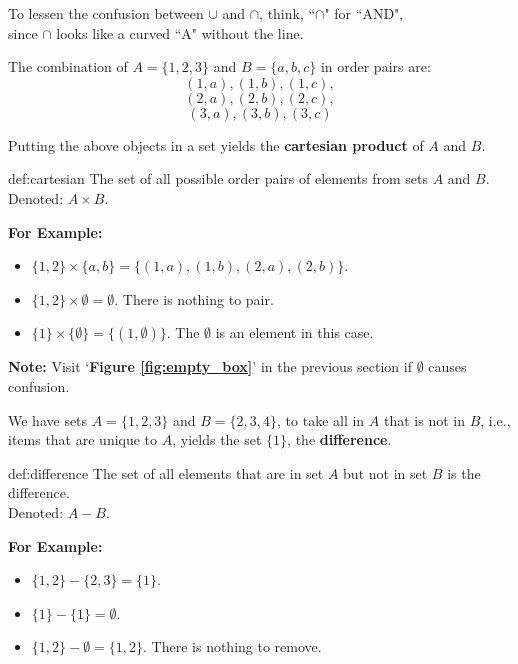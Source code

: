 \begin{Tip}
    To lessen the confusion between $\cup$ and $\cap$, think, ``$\cap$" for ``AND",\\
    since $\cap$ looks like a curved ``A" without the line. \\
\end{Tip}

\noindent
The combination of $A=\{1,2,3\}$ and $B=\{a,b,c\}$ in order pairs are:
$$(1,a), (1,b), (1,c), $$
$$(2,a), (2,b), (2,c), $$
$$(3,a), (3,b), (3,c)$$

\noindent
Putting the above objects in a set yields the \textbf{cartesian product} of $A$ and $B$.

\begin{Def}{def:cartesian}
    The set of all possible order pairs of elements from sets $A$ and $B$.\\
    Denoted: $A \times B$.
\end{Def}

\noindent
\textbf{For Example:}
\begin{itemize}
    \item $\{1, 2\} \times \{a, b\} = \{(1,a), (1,b), (2,a), (2,b)\}$.
    \item $\{1,2\} \times \emptyset = \emptyset$. There is nothing to pair.
    \item $\{1\} \times \{\emptyset\} = \{(1,\emptyset)\}$. The $\emptyset$ is an element in this case.
\end{itemize}

\begin{Note}
    \textbf{Note:} Visit `\textbf{Figure \ref{fig:empty_box}}' in the previous section if $\emptyset$ causes confusion.
\end{Note}


\noindent
We have sets $A=\{1,2,3\}$ and $B=\{2,3,4\}$, to take all in $A$ that is not in $B$, i.e.,
items that are unique to $A$, yields the set $\{1\}$, the \textbf{difference}.\\

\begin{Def}[Difference]{def:difference}
    The set of all elements that are in set $A$ but not in set $B$ is the difference.\\
    Denoted: $A - B$.
\end{Def}

\noindent
\textbf{For Example:}
\begin{itemize}
    \item $\{1, 2\} - \{2, 3\} = \{1\}$.
    \item $\{1\} - \{1\} = \emptyset$.
    \item $\{1,2\} - \emptyset = \{1, 2\}$. There is nothing to remove.
\end{itemize}

